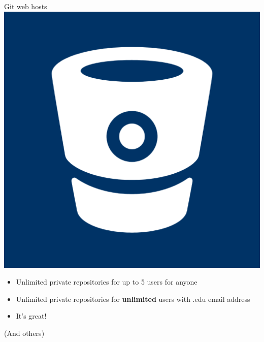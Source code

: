 \documentclass[xcolor=dvipsnames]{beamer}
\begin{document}
\begin{frame}{Git web hosts}
\vspace{5mm}
\includegraphics[scale=.03]{bitbucketlogo} \hspace{1mm}{\LARGE Bitbucket}
\begin{itemize}
\item Unlimited private repositories for up to 5 users for anyone
\item Unlimited private repositories for {\bf unlimited} users with .edu email address
\item It's great!
\end{itemize}

\vspace{3mm}
(And others)
\end{frame}
\end{document}
